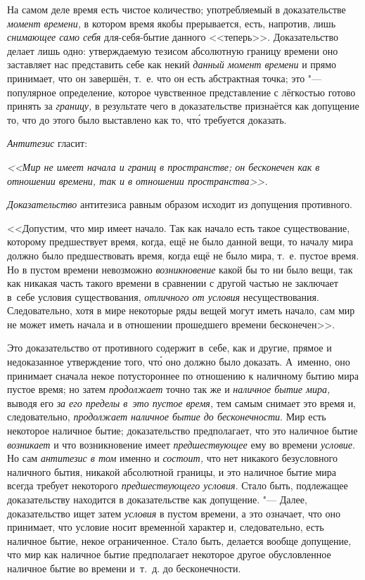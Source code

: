 На самом деле время есть чистое количество; употребляемый в доказательстве
{\em момент времени,} в котором время якобы прерывается, есть, напротив,
лишь {\em снимающее само себя} для-себя-бытие данного <<теперь>>.
Доказательство делает лишь одно: утверждаемую тезисом абсолютную границу
времени оно заставляет нас представить себе как некий
{\em данный момент времени} и прямо принимает, что он завершён, т.~е. что он
есть абстрактная точка; это "--- популярное определение, которое чувственное
представление с лёгкостью готово принять за {\em границу,} в результате чего
в доказательстве признаётся как допущение то, что до этого было выставлено как
то, чт\'{о} требуется доказать.

{\em Антитезис} гласит:

{\em <<Мир не имеет начала и границ в пространстве; он бесконечен
как в отношении времени, так и в отношении пространства>>.}

{\em Доказательство} антитезиса равным образом исходит из допущения противного.

<<Допустим, что мир имеет начало. Так как начало есть такое существование,
которому предшествует время, когда, ещё не было данной вещи, то началу мира
должно было предшествовать время, когда ещё не было мира, т.~е. пустое время.
Но в пустом времени невозможно {\em возникновение} какой бы то ни было вещи,
так как никакая часть такого времени в сравнении с другой частью не заключает
в~себе условия существования, {\em отличного от условия} несуществования.
Следовательно, хотя в мире некоторые ряды вещей могут иметь начало,
сам мир не может иметь начала и в отношении прошедшего времени бесконечен>>.

Это доказательство от противного содержит в~себе, как и другие, прямое и
недоказанное утверждение того, чт\'{о} оно должно было доказать. А~именно, оно
принимает сначала некое потустороннее по отношению к наличному бытию мира
пустое время; но затем {\em продолжает} точно так же и
{\em наличное бытие мира,} выводя его {\em за его пределы в~это пустое время,}
тем самым снимает это время и, следовательно,
{\em продолжает наличное бытие до бесконечности}. Мир есть некоторое
наличное бытие; доказательство предполагает, что это наличное бытие
{\em возникает} и что возникновение имеет {\em предшествующее} ему во времени
{\em условие}. Но сам {\em антитезис в том} именно и {\em состоит,} что нет
никакого безусловного наличного бытия, никакой абсолютной границы, и это наличное
бытие мира всегда требует некоторого {\em предшествующего условия}. Стало
быть, подлежащее доказательству находится в доказательстве как
допущение. "--- Далее, доказательство ищет затем {\em условия} в пустом
времени, а это означает, что оно принимает, что условие носит временн\'{о}й
характер и, следовательно, есть наличное бытие, некое ограниченное. Стало быть,
делается вообще допущение, что мир как наличное бытие предполагает некоторое
другое обусловленное наличное бытие во времени и~т.~д. до бесконечности.

